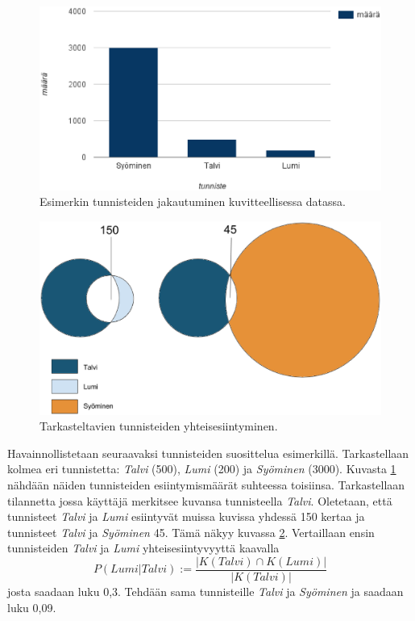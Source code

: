 \documentclass[12pt,finnish]{tktltiki2}
\theoremstyle{definition}
\theoremstyle{remark}
\begin{document}
\begin{figure}[]
\includegraphics[width = 390pt]{tunnisteet.eps}\caption{Esimerkin tunnisteiden jakautuminen kuvitteellisessa datassa.}
\label{esimerkkitunnisteet}
\end{figure}
\begin{figure}[]
\includegraphics[width = 330pt]{uudetvennit.eps}\caption{Tarkasteltavien tunnisteiden yhteisesiintyminen.}
\label{vennit}
\end{figure}
Havainnollistetaan seuraavaksi tunnisteiden suosittelua esimerkillä. Tarkastellaan kolmea eri tunnistetta: \textit{Talvi} (500), \textit{Lumi} (200) ja \textit{Syöminen} (3000). Kuvasta \ref{esimerkkitunnisteet} nähdään näiden tunnisteiden esiintymismäärät suhteessa toisiinsa. Tarkastellaan tilannetta jossa käyttäjä merkitsee kuvansa tunnisteella \textit{Talvi}. Oletetaan, että tunnisteet \textit{Talvi} ja \textit{Lumi} esiintyvät muissa kuvissa yhdessä 150 kertaa ja tunnisteet \textit{Talvi} ja \textit{Syöminen} 45. Tämä näkyy kuvassa \ref{vennit}. Vertaillaan ensin tunnisteiden \textit{Talvi} ja \textit{Lumi} yhteisesiintyvyyttä kaavalla 
\begin{displaymath} 
P (Lumi | Talvi):= \frac{|K(Talvi) \cap K(Lumi)|} {|K(Talvi)|}
\end{displaymath}
josta saadaan luku 0,3.
Tehdään sama tunnisteille \textit{Talvi} ja \textit{Syöminen} ja saadaan luku 0,09. 
\end{document}
